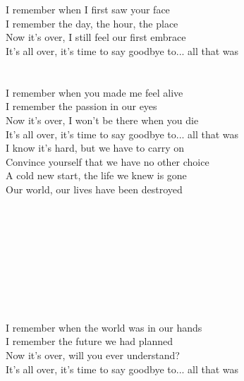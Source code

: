 \clearpage
{}
\tab{}\tab{}\tab{}\\
\tab{}\tab{}\tab{}\\
I remember when I first saw your face \tab{}\\
I remember the day, the hour, the place \tab{}\\
Now it's over, I still feel our first embrace \tab{}\\
It's all over, it's time to say goodbye to... all that was \\
\tab{}\tab{}\tab{}\\
\tab{}\tab{}\tab{}\\
I remember when you made me feel alive\\
I remember the passion in our eyes\\
Now it's over, I won't be there when you die\\
It's all over, it's time to say goodbye to... all that was\\
\hops
I know it's hard, but we have to carry on \tab{}\\
Convince yourself that we have no other choice\\
A cold new start, the life we knew is gone\tab{}\\
Our world, our lives have been destroyed\tab{}\\
\tab{}\tab{}\tab{}\\
\tab{}\tab{}\tab{}\\
\tab{}\tab{}\tab{}\\
\tab{}\tab{}\tab{}\\
\tab{}\tab{}\tab{}\\
\tab{}\tab{}\tab{}\\
\tab{}\tab{}\tab{}\\
\tab{}\tab{}\tab{}\\
\tab{}\tab{}\tab{}\\
I remember when the world was in our hands\\
I remember the future we had planned\\
Now it's over, will you ever understand?\\
It's all over, it's time to say goodbye to... all that was\\
\tab{}\tab{}\tab{}\\
\tab{}\tab{}\tab{}\\
\tab{}\tab{}\tab{}\\
\tab{}\tab{}\tab{}\\
\tab{}\tab{}\tab{}\\
\tab{}\tab{}\tab{}\\
\tab{}\tab{}\tab{}\\

